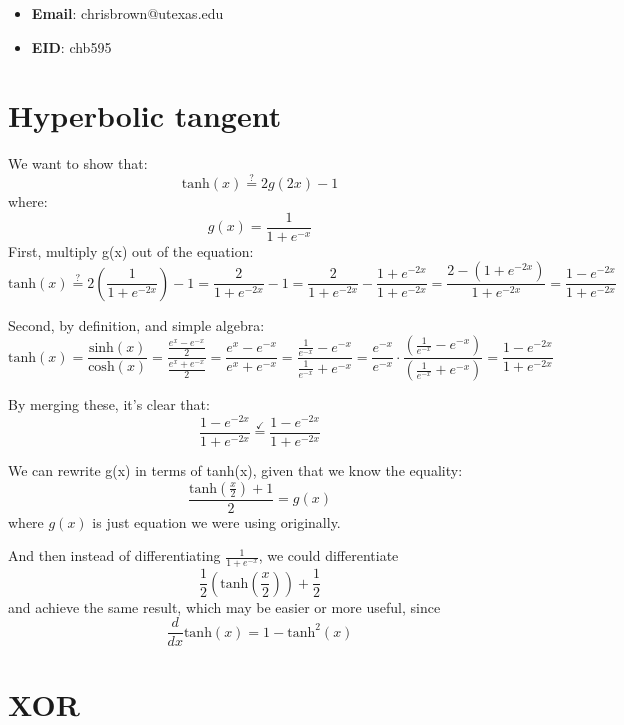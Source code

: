 \documentclass[11pt]{report}
\begin{document}
\begin{itemize}
  \item \textbf{Email}: chrisbrown@utexas.edu
  \item \textbf{EID}: chb595
\end{itemize}

\section{Hyperbolic tangent}
We want to show that:
\[ \text{tanh}(x) \overset{?}{=} 2g(2x) - 1 \]
where:
\[ g(x) = \frac{1}{1 + e^{-x}} \]
First, multiply g(x) out of the equation:
\[ \text{tanh}(x) \overset{?}{=} 2\left(\frac{1}{1 + e^{-2x}}\right) - 1 =
  \frac{2}{1 + e^{-2x}} - 1 =
  \frac{2}{1 + e^{-2x}} - \frac{1 + e^{-2x}}{1 + e^{-2x}} =
  \frac{2 - (1 + e^{-2x})}{1 + e^{-2x}} =
  \frac{1 - e^{-2x}}{1 + e^{-2x}}
\]

\medskip\noindent
Second, by definition, and simple algebra:
\[ \text{tanh}(x) =
  \frac{\text{sinh}(x)}{\text{cosh}(x)} =
  \frac{\frac{e^{x} - e^{-x}}{2}}{\frac{e^{x} + e^{-x}}{2}} =
  \frac{e^{x} - e^{-x}}{e^{x} + e^{-x}} = 
  \frac{\frac{1}{e^{-x}} - e^{-x}}{\frac{1}{e^{-x}} + e^{-x}} = 
  \frac{e^{-x}}{e^{-x}} \cdot \frac{\left(\frac{1}{e^{-x}} - e^{-x}\right)}{\left(\frac{1}{e^{-x}} + e^{-x}\right)} =
  \frac{1 - e^{-2x}}{1 + e^{-2x}}
\]

\medskip\noindent
By merging these, it's clear that:
\[ \frac{1 - e^{-2x}}{1 + e^{-2x}} \overset{\checkmark}{=} \frac{1 - e^{-2x}}{1 + e^{-2x}} \]


\bigskip\noindent
We can rewrite g(x) in terms of tanh(x), given that we know the equality:
\[\frac{\text{tanh}(\frac{x}{2}) + 1}{2} = g(x)\]
where $g(x)$ is just equation we were using originally.

\smallskip\noindent
And then instead of differentiating \(\frac{1}{1 + e^{-x}}\), we could differentiate
\[
  \frac{1}{2}\left(\text{tanh}(\frac{x}{2})\right) + \frac{1}{2}
\]
and achieve the same result, which may be easier or more useful, since
\[ \frac{d}{dx} \text{tanh}(x) = 1 - \text{tanh}^2(x) \]

\section{XOR}
\end{document}
